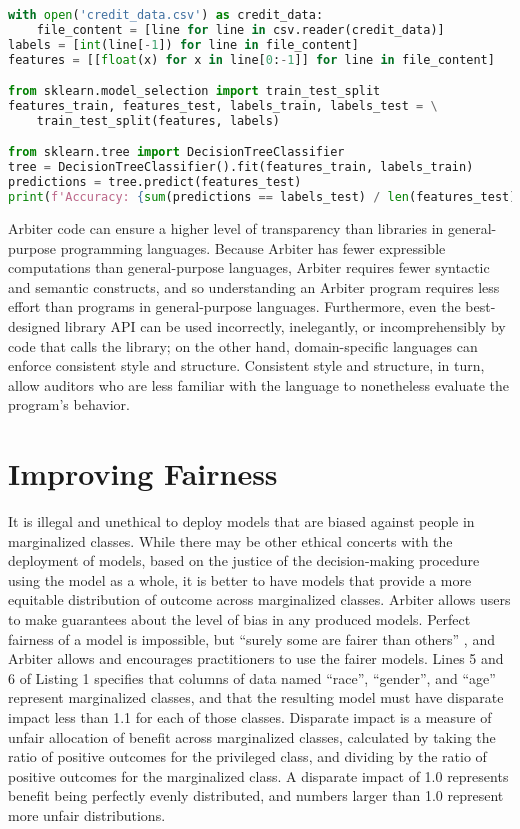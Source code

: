 \documentclass[letterpaper]{article}
\newcommand{\citep}[1]{\cite{#1}}
\begin{document}
\begin{lstlisting}[language=Python,caption=Python code equivalent to lines 1-3 in Listing 1.]
with open('credit_data.csv') as credit_data:
    file_content = [line for line in csv.reader(credit_data)]
labels = [int(line[-1]) for line in file_content]
features = [[float(x) for x in line[0:-1]] for line in file_content]

from sklearn.model_selection import train_test_split
features_train, features_test, labels_train, labels_test = \
    train_test_split(features, labels)

from sklearn.tree import DecisionTreeClassifier
tree = DecisionTreeClassifier().fit(features_train, labels_train)
predictions = tree.predict(features_test)
print(f'Accuracy: {sum(predictions == labels_test) / len(features_test)}')
\end{lstlisting}

Arbiter code can ensure a higher level of transparency than libraries in general-purpose programming languages. Because Arbiter has fewer expressible computations than general-purpose languages, Arbiter requires fewer syntactic and semantic constructs, and so understanding an Arbiter program requires less effort than programs in general-purpose languages. Furthermore, even the best-designed library API can be used incorrectly, inelegantly, or incomprehensibly by code that calls the library; on the other hand, domain-specific languages can enforce consistent style and structure. Consistent style and structure, in turn, allow auditors who are less familiar with the language to nonetheless evaluate the program's behavior. 

\section{Improving Fairness}
It is illegal and unethical to deploy models that are biased against people in marginalized classes. While there may be other ethical concerts with the deployment of models, based on the justice of the decision-making procedure using the model as a whole, it is better to have models that provide a more equitable distribution of outcome across marginalized classes. Arbiter allows users to make guarantees about the level of bias in any produced models. Perfect fairness of a model is impossible, but ``surely some are fairer than others'' \citep{Grant2019}, and Arbiter allows and encourages practitioners to use the fairer models. Lines 5 and 6 of Listing 1 specifies that columns of data named ``race'', ``gender'', and ``age'' represent marginalized classes, and that the resulting model must have disparate impact less than 1.1 for each of those classes. Disparate impact is a measure of unfair allocation of benefit across marginalized classes, calculated by taking the ratio of positive outcomes for the privileged class, and dividing by the ratio of positive outcomes for the marginalized class. A disparate impact of 1.0 represents benefit being perfectly evenly distributed, and  numbers larger than 1.0 represent more unfair distributions. 
\end{document}

